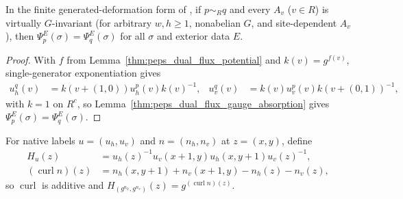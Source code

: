 \begin{theorem}%
    \label{thm:peps_dual_flux_deformation}
    \leanok
    In the finite generated-deformation form of
    \cite[Lemma~6.14]{Schuch2010PEPS}, if $p\sim_R q$ and every $A_v$ ($v\in R$)
    is virtually $G$-invariant (for arbitrary $w,h\ge1$, nonabelian $G$, and
    site-dependent $A_v$), then $\Psi_p^E(\sigma)=\Psi_q^E(\sigma)$ for all
    $\sigma$ and exterior data $E$.
\end{theorem}
\begin{proof}\leanok
    With $f$ from Lemma~\ref{thm:peps_dual_flux_potential} and $k(v)=g^{f(v)}$,
    single-generator exponentiation gives
    \begin{align}
        u_h^q(v) & =k(v+(1,0))u_h^p(v)k(v)^{-1}, &
        u_v^q(v) & =k(v)u_v^p(v)k(v+(0,1))^{-1},
        \label{eq:peps_dual_label_gauge}
    \end{align}
    with $k=1$ on $R^c$, so Lemma~\ref{thm:peps_dual_flux_gauge_absorption}
    gives $\Psi_p^E(\sigma)=\Psi_q^E(\sigma)$.
\end{proof}

\begin{definition}%
    \label{def:peps_dual_flux_curl}
    \leanok
    For native labels $u=(u_h,u_v)$ and $n=(n_h,n_v)$ at $z=(x,y)$, define
    \begin{align}
        H_u(z)                    & =u_h(z)^{-1}u_v(x+1,y)u_h(x,y+1)u_v(z)^{-1},
        \label{eq:peps_dual_native_holonomy}                                     \\
        (\operatorname{curl}n)(z) & =n_h(x,y+1)+n_v(x+1,y)-n_h(z)-n_v(z),
        \label{eq:peps_dual_native_curl}
    \end{align}
    so $\operatorname{curl}$ is additive and
    $H_{(g^{n_h},g^{n_v})}(z)=g^{(\operatorname{curl}n)(z)}$.
\end{definition}

